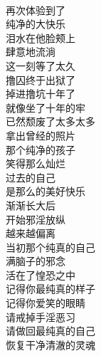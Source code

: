 \begin{poem}[记得你最纯真的样子]
    \begin{multicols}{2}
        \centering~\\
        再次体验到了 \\ 纯净的大快乐 \\ 泪水在他脸颊上 \\ 肆意地流淌 \\ 这一刻等了太久 \\ 撸囚终于出狱了 \\ 掉进撸坑十年了 \\ 就像坐了十年的牢 \\ 已然颓废了太多太多 \\ 拿出曾经的照片 \\ 那个纯净的孩子 \\ 笑得那么灿烂 \\ 过去的自己 \\ 是那么的美好快乐 \\ 渐渐长大后 \\ 开始邪淫放纵 \\ 越来越偏离 \\ 当初那个纯真的自己 \\ 满脑子的邪念 \\ 活在了惶恐之中 \\ 记得你最纯真的样子 \\ 记得你爱笑的眼睛 \\ 请戒掉手淫恶习 \\ 请做回最纯真的自己 \\ 恢复干净清澈的灵魂
    \end{multicols}
\end{poem}

